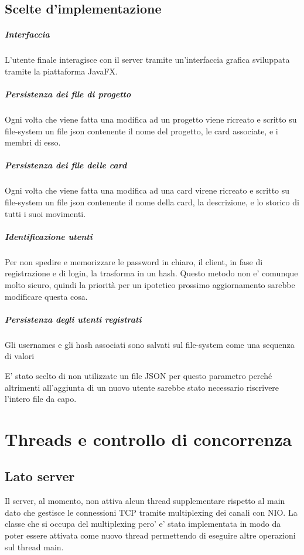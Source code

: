 \section*{Scelte d'implementazione}
\paragraph*{Interfaccia} L'utente finale interagisce con il server tramite un'interfaccia grafica sviluppata tramite la piattaforma JavaFX.
\paragraph*{Persistenza dei file di progetto} Ogni volta che viene fatta una modifica ad un progetto viene ricreato e scritto su file-system un file json contenente il nome del progetto, le card associate, e i membri di esso.
\paragraph*{Persistenza dei file delle card} Ogni volta che viene fatta una modifica ad una card virene ricreato e scritto su file-system un file json contenente il nome della card, la descrizione, e lo storico di tutti i suoi movimenti.
\paragraph*{Identificazione utenti} Per non spedire e memorizzare le password in chiaro, il client, in fase di registrazione e di login, la trasforma in un hash. Questo metodo non e' comunque molto sicuro, quindi la priorità per un ipotetico prossimo aggiornamento sarebbe modificare questa cosa.
\paragraph*{Persistenza degli utenti registrati} Gli usernames e gli hash associati sono salvati sul file-system come una sequenza di valori
\begin{center}
\end{center}
E' stato scelto di non utilizzate un file JSON per questo parametro perché altrimenti all'aggiunta di un nuovo utente sarebbe stato necessario riscrivere l'intero file da capo.

\chapter*{Threads e controllo di concorrenza}
\section*{Lato server}
Il server, al momento, non attiva alcun thread supplementare rispetto al main dato che gestisce le connessioni TCP tramite multiplexing dei canali con NIO.
La classe che si occupa del multiplexing pero' e' stata implementata in modo da poter essere attivata come nuovo thread permettendo di eseguire altre operazioni sul thread main.

